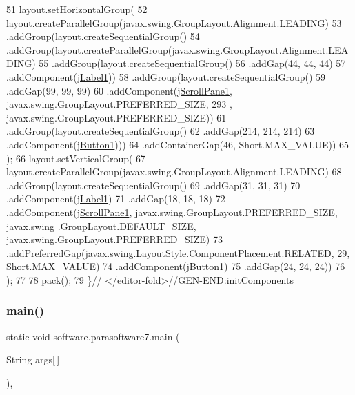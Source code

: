 \begin{DoxyCode}
51         layout.setHorizontalGroup(
52             layout.createParallelGroup(javax.swing.GroupLayout.Alignment.LEADING)
53             .addGroup(layout.createSequentialGroup()
54                 .addGroup(layout.createParallelGroup(javax.swing.GroupLayout.Alignment.LEADING)
55                     .addGroup(layout.createSequentialGroup()
56                         .addGap(44, 44, 44)
57                         .addComponent(\mbox{\hyperlink{classsoftware_1_1parasoftware7_acf4de3dce9e1861b004011df14fb9d06}{jLabel1}}))
58                     .addGroup(layout.createSequentialGroup()
59                         .addGap(99, 99, 99)
60                         .addComponent(\mbox{\hyperlink{classsoftware_1_1parasoftware7_a7579f4ce7f3b0e82e4aa3ea603dc6307}{jScrollPane1}}, javax.swing.GroupLayout.PREFERRED\_SIZE, 293
      , javax.swing.GroupLayout.PREFERRED\_SIZE))
61                     .addGroup(layout.createSequentialGroup()
62                         .addGap(214, 214, 214)
63                         .addComponent(\mbox{\hyperlink{classsoftware_1_1parasoftware7_ad1649be57f87718bce210a36a2b5a8c3}{jButton1}})))
64                 .addContainerGap(46, Short.MAX\_VALUE))
65         );
66         layout.setVerticalGroup(
67             layout.createParallelGroup(javax.swing.GroupLayout.Alignment.LEADING)
68             .addGroup(layout.createSequentialGroup()
69                 .addGap(31, 31, 31)
70                 .addComponent(\mbox{\hyperlink{classsoftware_1_1parasoftware7_acf4de3dce9e1861b004011df14fb9d06}{jLabel1}})
71                 .addGap(18, 18, 18)
72                 .addComponent(\mbox{\hyperlink{classsoftware_1_1parasoftware7_a7579f4ce7f3b0e82e4aa3ea603dc6307}{jScrollPane1}}, javax.swing.GroupLayout.PREFERRED\_SIZE, javax.swing
      .GroupLayout.DEFAULT\_SIZE, javax.swing.GroupLayout.PREFERRED\_SIZE)
73                 .addPreferredGap(javax.swing.LayoutStyle.ComponentPlacement.RELATED, 29, Short.MAX\_VALUE)
74                 .addComponent(\mbox{\hyperlink{classsoftware_1_1parasoftware7_ad1649be57f87718bce210a36a2b5a8c3}{jButton1}})
75                 .addGap(24, 24, 24))
76         );
77 
78         pack();
79     \}\textcolor{comment}{// </editor-fold>//GEN-END:initComponents}
\end{DoxyCode}
\mbox{\label{classsoftware_1_1parasoftware7_a456d5d0a82d053ae77f2f9413e45f403}} 
\subsubsection{\texorpdfstring{main()}{main()}}
{\footnotesize\ttfamily static void software.\+parasoftware7.\+main (\begin{DoxyParamCaption}\item[{String}]{args\mbox{[}$\,$\mbox{]} }\end{DoxyParamCaption})\hspace{0.3cm}{\ttfamily [inline]}, {\ttfamily [static]}}


